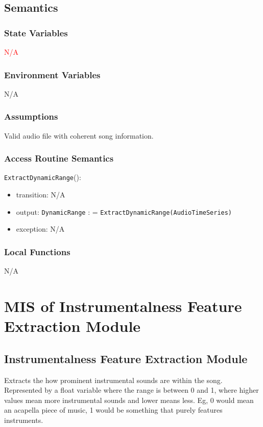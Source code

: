 \documentclass[12pt, titlepage]{article}
\begin{document}
\subsection{Semantics}

\subsubsection{State Variables}
\textcolor{red}{N/A}

\subsubsection{Environment Variables}
N/A

\subsubsection{Assumptions}
Valid audio file with coherent song information.

\subsubsection{Access Routine Semantics}

\noindent \texttt{Extract\textunderscore Dynamic\textunderscore Range}():
\begin{itemize}
\item transition: N/A
\item output: \texttt{DynamicRange} : = \texttt{Extract\textunderscore Dynamic\textunderscore Range(Audio\textunderscore Time\textunderscore Series)}
\item exception: N/A
\end{itemize}

\subsubsection{Local Functions}
N/A

\section{MIS of Instrumentalness Feature Extraction Module} 

\subsection{Instrumentalness Feature Extraction Module}
Extracts the how prominent instrumental sounds are within the song. Represented by a float
variable where the range is between 0 and 1, where higher values mean more instrumental sounds
and lower means less. Eg, 0 would mean an acapella piece of music, 1 would be something that purely
features instruments.  
\end{document}
